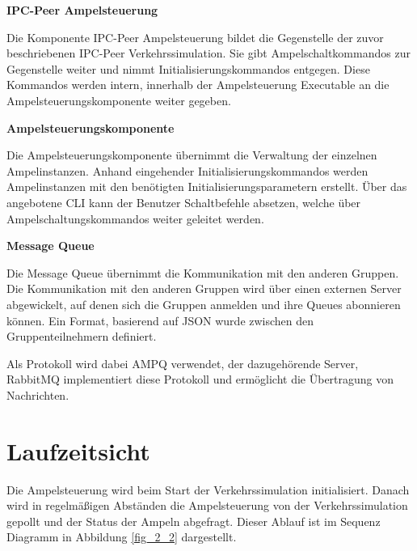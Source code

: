 \begin{flushleft}
\textbf{IPC-Peer Ampelsteuerung}
\end{flushleft}
\vspace{-0.3 cm}

Die Komponente IPC-Peer Ampelsteuerung bildet die Gegenstelle der zuvor beschriebenen IPC-Peer Verkehrssimulation. Sie gibt Ampelschaltkommandos zur Gegenstelle weiter und nimmt Initialisierungskommandos entgegen. Diese Kommandos werden intern, innerhalb der Ampelsteuerung Executable an die Ampelsteuerungskomponente weiter gegeben.

\begin{flushleft}
\textbf{Ampelsteuerungskomponente}
\end{flushleft}
\vspace{-0.3 cm}

Die Ampelsteuerungskomponente übernimmt die Verwaltung der einzelnen Ampelinstanzen. Anhand eingehender Initialisierungskommandos werden Ampelinstanzen mit den benötigten Initialisierungsparametern erstellt. Über das angebotene CLI kann der Benutzer Schaltbefehle absetzen, welche über Ampelschaltungskommandos weiter geleitet werden.

\begin{flushleft}
\textbf{Message Queue}
\end{flushleft}
\vspace{-0.3 cm}

Die Message Queue übernimmt die Kommunikation mit den anderen Gruppen. Die Kommunikation mit den anderen Gruppen wird über einen externen Server abgewickelt, auf denen sich die Gruppen anmelden und ihre Queues abonnieren können. Ein Format, basierend auf JSON wurde zwischen den Gruppenteilnehmern definiert.

Als Protokoll wird dabei AMPQ verwendet, der dazugehörende Server, RabbitMQ implementiert diese Protokoll und ermöglicht die Übertragung von Nachrichten.

\section{Laufzeitsicht}
\label{Laufzeitsicht}

Die Ampelsteuerung wird beim Start der Verkehrssimulation initialisiert. Danach wird in regelmäßigen Abständen die Ampelsteuerung von der Verkehrssimulation gepollt und der Status der Ampeln abgefragt.
Dieser Ablauf ist im Sequenz Diagramm in Abbildung \ref{fig_2_2} dargestellt.

